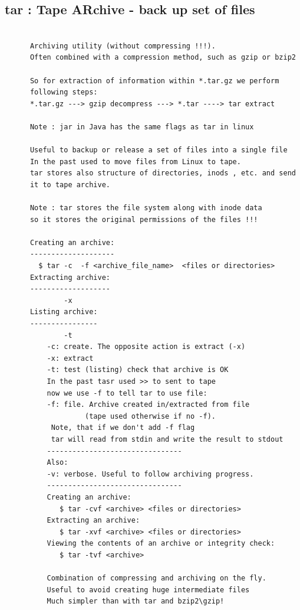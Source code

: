 \documentclass[a4paper,12pt]{article}
\begin{document}
\subsection{tar  : Tape ARchive - back up set of files}
\begin{verbatim}
      
      Archiving utility (without compressing !!!).
      Often combined with a compression method, such as gzip or bzip2
      
      So for extraction of information within *.tar.gz we perform 
      following steps:       
      *.tar.gz ---> gzip decompress ---> *.tar ----> tar extract

      Note : jar in Java has the same flags as tar in linux      
      
      Useful to backup or release a set of files into a single file
      In the past used to move files from Linux to tape.
      tar stores also structure of directories, inods , etc. and send 
      it to tape archive.
      
      Note : tar stores the file system along with inode data
      so it stores the original permissions of the files !!!
      
      Creating an archive:
      --------------------
        $ tar -c  -f <archive_file_name>  <files or directories>
      Extracting archive:
      -------------------      
              -x  
      Listing archive:
      ----------------      
              -t
          -c: create. The opposite action is extract (-x)
          -x: extract
          -t: test (listing) check that archive is OK
          In the past tasr used >> to sent to tape
          now we use -f to tell tar to use file:
          -f: file. Archive created in/extracted from file 
                   (tape used otherwise if no -f).
           Note, that if we don't add -f flag 
           tar will read from stdin and write the result to stdout         
          --------------------------------
          Also:
          -v: verbose. Useful to follow archiving progress.
          --------------------------------
          Creating an archive:
             $ tar -cvf <archive> <files or directories>
          Extracting an archive:
             $ tar -xvf <archive> <files or directories>       
          Viewing the contents of an archive or integrity check:
             $ tar -tvf <archive>
           
          Combination of compressing and archiving on the fly.
          Useful to avoid creating huge intermediate files
          Much simpler than with tar and bzip2\gzip!


\end{verbatim}
\end{document}
